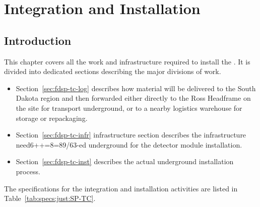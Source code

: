\chapter{Integration and Installation}
\label{ch:sp-tc}

\section{Introduction}
\label{ch:sp-tc-intro}




This  chapter covers all the work and infrastructure required to install the .  It is divided into dedicated sections describing the major divisions of work.  

\begin{itemize}
\item Section~\ref{sec:fdsp-tc-log} describes how material will be delivered to the South Dakota region and then forwarded  either  directly to the Ross Headframe on the  site for transport underground, or to a nearby logistics warehouse for storage or repackaging. 
\item Section~\ref{sec:fdsp-tc-infr} infrastructure section describes the infrastructure need6++=8=89/63-ed underground for the detector module installation.
\item Section~\ref{sec:fdsp-tc-inst} describes the actual underground installation process. 
\end{itemize}
 The specifications for the integration and installation activities are listed in Table~\ref{tab:specs:just:SP-TC}.

